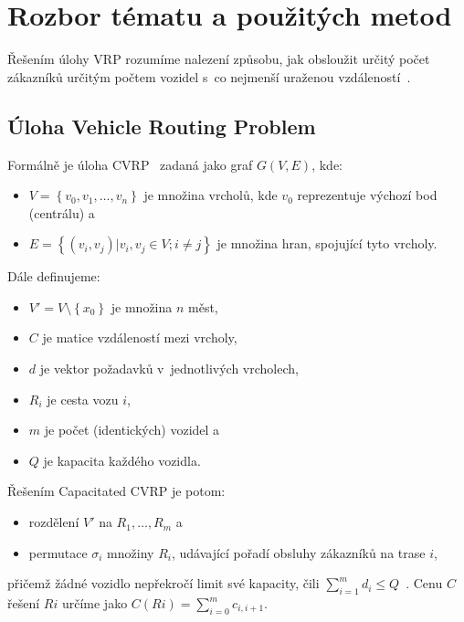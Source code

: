\documentclass[a4paper]{article}
\begin{document}
\section{Rozbor tématu a použitých metod}

Řešením úlohy VRP rozumíme nalezení způsobu, jak obsloužit určitý počet zákazníků určitým počtem vozidel s~co nejmenší uraženou vzdáleností~\cite{neo}.

\subsection{Úloha Vehicle Routing Problem}

Formálně je úloha CVRP~\cite{neo} zadaná jako graf $G(V,E)$, kde:

\begin{itemize}
\item $V = \left\{v_0,v_1,\dots,v_n\right\}$ je množina vrcholů, kde $v_0$ reprezentuje výchozí bod (centrálu) a
\item $E = \left\{(v_i,v_j)|v_i,v_j\in V; i \neq j\right\}$ je množina hran, spojující tyto vrcholy.
\end{itemize}

\noindent Dále definujeme:

\begin{itemize}
\item $V' = V\setminus \left\{x_0\right\}$ je množina $n$ měst,
\item $C$ je matice vzdáleností mezi vrcholy,
\item $d$ je vektor požadavků v~jednotlivých vrcholech,
\item $R_i$ je cesta vozu $i$,
\item $m$ je počet (identických) vozidel a
\item $Q$ je kapacita každého vozidla.
\end{itemize}

\noindent Řešením Capacitated CVRP je potom:

\begin{itemize}
\item rozdělení $V'$ na $R_1,\dots,R_m$ a
\item permutace $\sigma_i$ množiny $R_i$, udávající pořadí obsluhy zákazníků na trase $i$,
\end{itemize}

\noindent přičemž žádné vozidlo nepřekročí limit své kapacity, čili $\sum\limits_{i=1}^{m}d_i\leq Q$~\cite{cneo}. Cenu $C$ řešení $Ri$ určíme jako $C(Ri)=\sum\limits_{i=0}^m c_{i,i+1}$.
\end{document}
